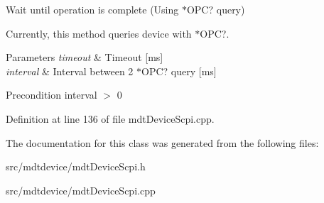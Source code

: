 Wait until operation is complete (Using $\ast$OPC? query) 

Currently, this method queries device with $\ast$OPC?.


\begin{DoxyParams}{Parameters}
{\em timeout} & Timeout \mbox{[}ms\mbox{]} \\
\hline
{\em interval} & Interval between 2 $\ast$OPC? query \mbox{[}ms\mbox{]} \\
\hline
\end{DoxyParams}
\begin{DoxyPrecond}{Precondition}
interval $>$ 0 
\end{DoxyPrecond}


Definition at line 136 of file mdtDeviceScpi.cpp.



The documentation for this class was generated from the following files:\begin{DoxyCompactItemize}
\item 
src/mdtdevice/mdtDeviceScpi.h\item 
src/mdtdevice/mdtDeviceScpi.cpp\end{DoxyCompactItemize}
